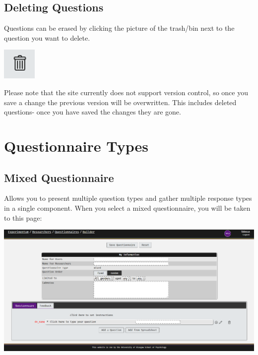 \documentclass[]{book}
\begin{document}
\hypertarget{deleting-questions}{%
\subsection{Deleting Questions}\label{deleting-questions}}

Questions can be erased by clicking the picture of the trash/bin next to the question you want to delete.

\includegraphics{images/screenshots/bin.png}

\begin{danger}
Please note that the site currently does not support version control, so
once you save a change the previous version will be overwritten. This
includes deleted questions- once you have saved the changes they are
gone.
\end{danger}

\hypertarget{questionnaire-types}{%
\section{Questionnaire Types}\label{questionnaire-types}}

\hypertarget{mixed-questionnaire}{%
\subsection{Mixed Questionnaire}\label{mixed-questionnaire}}

Allows you to present multiple question types and gather multiple response types in a single component. When you select a mixed questionnaire, you will be taken to this page:

\includegraphics{images/screenshots/quest_mixed.png}
\end{document}
